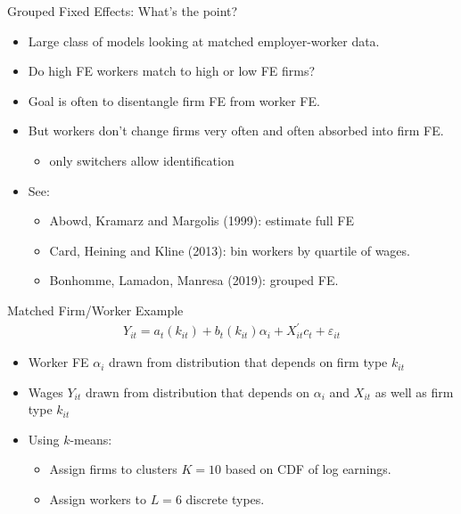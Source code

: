 \documentclass[xcolor=pdftex,dvipsnames,table,mathserif,aspectratio=169]{beamer}
\begin{document}
\begin{frame}{Grouped Fixed Effects: What's the point? }
\begin{itemize}
\item Large class of models looking at matched employer-worker data.
\item Do high FE workers match to high or low FE firms?
\item Goal is often to disentangle firm FE from worker FE.
\item But workers don't change firms very often and often absorbed into firm FE.
\begin{itemize}
\item only switchers allow identification
\end{itemize}
\item See:
\begin{itemize}
\item Abowd, Kramarz and Margolis (1999): estimate full FE
\item Card, Heining and Kline (2013): bin workers by quartile of wages.
\item Bonhomme, Lamadon, Manresa (2019): grouped FE.
\end{itemize}
\end{itemize}
\end{frame}

\begin{frame}{Matched Firm/Worker Example}
\begin{align*}
Y_{i t}=a_{t}\left(k_{i t}\right)+b_{t}\left(k_{i t}\right) \alpha_{i}+X_{i t}^{\prime} c_{t}+\varepsilon_{i t}
\end{align*}
\begin{itemize}
\item Worker FE $\alpha_{i}$ drawn from distribution that depends on firm type $k_{it}$
\item Wages $Y_{it}$ drawn from distribution that depends on $\alpha_i$ and $X_{it}$ as well as firm type $k_{it}$
\item Using $k$-means:
\begin{itemize}
\item Assign firms to clusters $K=10$ based on CDF of log earnings.
\item Assign workers to $L=6$ discrete types.
\end{itemize}
\end{itemize}
\end{frame}
\end{document}
